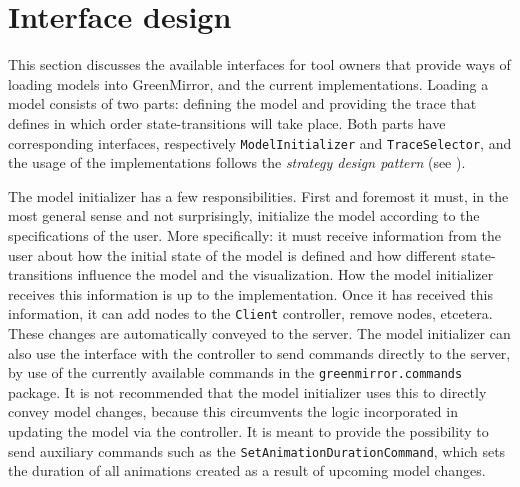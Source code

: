 \documentclass[a4paper]{article}
\begin{document}








\section{Interface design}\label{sec:interfacedesign}
This section discusses the available interfaces for tool owners that provide ways of loading models into GreenMirror, and the current implementations. Loading a model consists of two parts: defining the model and providing the trace that defines in which order state-transitions will take place. Both parts have corresponding interfaces, respectively \lstinline{ModelInitializer} and \lstinline{TraceSelector}, and the usage of the implementations follows the \emph{strategy design pattern} (see \cite{kuchana2004,sourcemaking}).

The model initializer has a few responsibilities. First and foremost it must, in the most general sense and not surprisingly, initialize the model according to the specifications of the user. More specifically: it must receive information from the user about how the initial state of the model is defined and how different state-transitions influence the model and the visualization. How the model initializer receives this information is up to the implementation. Once it has received this information, it can add nodes to the \lstinline{Client} controller, remove nodes, etcetera. These changes are automatically conveyed to the server. The model initializer can also use the interface with the controller to send commands directly to the server, by use of the currently available commands in the \lstinline{greenmirror.commands} package. It is not recommended that the model initializer uses this to directly convey model changes, because this circumvents the logic incorporated in updating the model via the controller. It is meant to provide the possibility to send auxiliary commands such as the \lstinline{SetAnimationDurationCommand}, which sets the duration of all animations created as a result of upcoming model changes.
\end{document}
